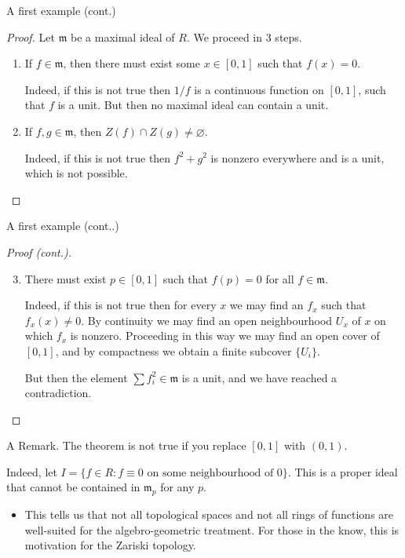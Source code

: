 \documentclass[aspectratio=169,10pt]{beamer}
\begin{document}
\begin{frame}{A first example (cont.)}
\begin{proof}
    \renewcommand{\qedsymbol}{}
    Let $\mathfrak{m}$ be a maximal ideal of $R$. We proceed in 3 steps.
    \begin{enumerate}
        \pause
        \item If $f\in\mathfrak{m}$, then there must exist some $x \in [0,1]$ such that $f(x) = 0$.
        
        Indeed, if this is not true then $1/f$ is a continuous function on $[0,1]$, such that $f$ is a unit. But then no maximal ideal can contain a unit.
        \pause
        \item If $f,g \in \mathfrak{m}$, then $Z(f) \cap Z(g) \neq \varnothing$.

        Indeed, if this is not true then $f^2+g^2$ is nonzero everywhere and is a unit, which is not possible.
    \end{enumerate}
\end{proof}
\end{frame}

\begin{frame}{A first example (cont..)}
\begin{proof}[Proof (cont.)]
    \begin{enumerate}
        \setcounter{enumi}{2}
        \item There must exist $p \in [0,1]$ such that $f(p)=0$ for all $f \in \mathfrak{m}$.

        Indeed, if this is not true then for every $x$ we may find an $f_x$ such that $f_x(x) \neq 0$. By continuity we may find an open neighbourhood $U_x$ of $x$ on which $f_x$ is nonzero. Proceeding in this way we may find an open cover of $[0,1]$, and by compactness we obtain a finite subcover $\{U_i\}$.

        But then the element $\sum f_i^2 \in \mathfrak{m}$ is a unit, and we have reached a contradiction.
    \end{enumerate}
\end{proof}
\end{frame}


\begin{frame}{A Remark.}
The theorem is not true if you replace $[0,1]$ with $(0,1)$.

Indeed, let $I = \{f \in R : f \equiv 0 \text{ on some neighbourhood of }0\}$. This is a proper ideal that cannot be contained in $\mathfrak{m}_p$ for any $p$.

\begin{itemize}
    \item This tells us that not all topological spaces and not all rings of functions are well-suited for the algebro-geometric treatment. For those in the know, this is motivation for the  Zariski topology.
\end{itemize}
\end{frame}
\end{document}
